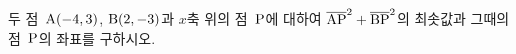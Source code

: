 두 점~$\mathrm{A}(-4{,}\mkern3mu\mathopen{}3)$, $\mathrm{B}(2{,}\mkern3mu\mathopen{}-3)$과 $x$축 위의 점~$\mathrm{P}$에 대하여 $\overline{\mathrm{AP}}^2+\overline{\mathrm{BP}}^2$의 최솟값과 그때의 점~$\mathrm{P}$의 좌표를 구하시오.
